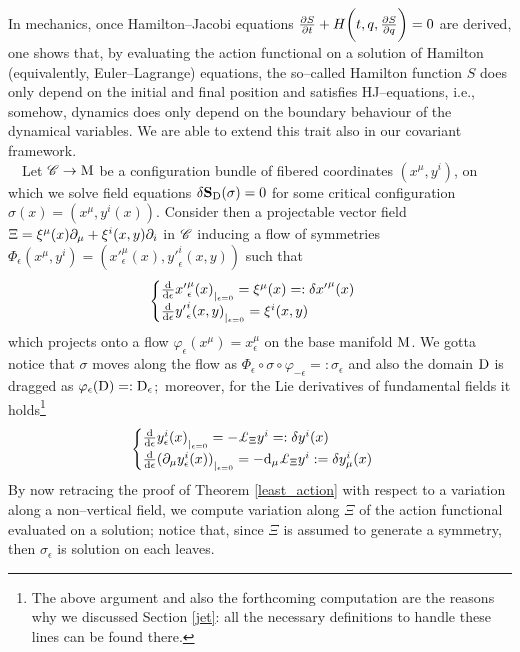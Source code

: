 In mechanics, once Hamilton--Jacobi equations $\frac{\partial S}{\partial{t}}+H\bigg(t,q,\frac{\partial S}{\partial q}\bigg)=0$ are derived, one shows that, by evaluating the action functional on a solution of Hamilton (equivalently, Euler--Lagrange) equations, the so--called Hamilton function $S$ does only depend on the initial and final position and satisfies HJ--equations, i.e., somehow, dynamics does only depend on the boundary behaviour of the dynamical variables. We are able to extend this trait also in our covariant framework.\\
\,\newline
\,\newline
Let $\mathscr{C}\to\text{\normalfont M}$ be a configuration bundle of fibered coordinates $(x^\mu,y^i)$, on which we solve field equations $\delta\mathbf{S}_{\text{\normalfont D}}(\sigma)=0$ for some critical configuration $\sigma(x)=(x^\mu,y^i(x))$. Consider then a projectable vector field $\Xi=\xi^\mu(x)\partial_\mu+\xi^i(x,y)\partial_i$ in $\mathscr{C}$ inducing a flow of symmetries $\Phi_\epsilon(x^\mu,y^i)=\left({x'}^\mu_\epsilon(x),{y'}^i_\epsilon(x,y)\right)$ such that
$$\begin{cases}
    {\frac{\text{\normalfont d}}{\text{\normalfont d}\epsilon}{x'}^\mu_\epsilon(x)}_{|_{\epsilon=0}}=\xi^\mu(x)=:\delta {x'}^\mu(x)\\
    {\frac{\text{\normalfont d}}{\text{\normalfont d} \epsilon}{y'}^i_\epsilon(x,y)}_{|_{\epsilon=0}}=\xi^i(x,y)
\end{cases}$$
which projects onto a flow $\varphi_\epsilon(x^\mu)=x^\mu_\epsilon$ on the base manifold $\text{\normalfont M}$. We gotta notice that $\sigma$ moves along the flow as $\Phi_\epsilon\circ\sigma\circ\varphi_{-\epsilon}=:\sigma_\epsilon$ and also the domain $\text{\normalfont D}$ is dragged as $\varphi_\epsilon(\text{\normalfont D})=:\text{\normalfont D}_\epsilon$;\, moreover, for the Lie derivatives of fundamental fields it holds\footnote{The above argument and also the forthcoming computation are the reasons why we discussed Section \ref{jet}: all the necessary definitions to handle these lines can be found there.}
$$\begin{cases}
    {\frac{\d}{\d\epsilon}{y}^i_\epsilon(x)}_{|_{\epsilon=0}}=-\pounds_\Xi y^i=:\delta y^i(x)\\
    {\frac{\d}{\d\epsilon}{(\der_\mu y^i_\epsilon(x))}}_{|_{\epsilon=0}}=-\d_\mu\pounds_\Xi y^i:=\delta y^i_\mu(x)
\end{cases}$$
By now retracing the proof of Theorem \ref{least_action} with respect to a variation along a non--vertical field, we compute variation along $\Xi$ of the action functional evaluated on a solution; notice that, since $\Xi$ is assumed to generate a symmetry, then $\sigma_\epsilon$ is solution on each leaves.

